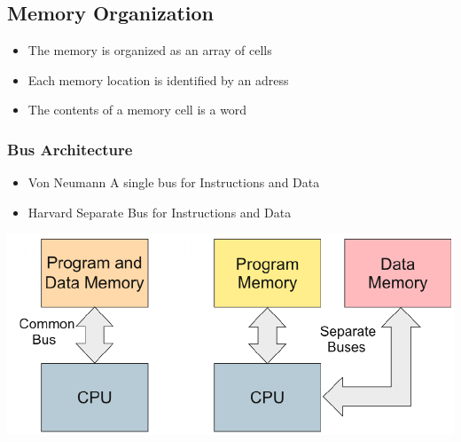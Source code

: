 \clearpage

\subsection{Memory Organization }
\begin{minipage}{9cm}
		\begin{itemize}
			\item The memory is organized as an array of cells
			\item Each memory location is identified by an adress
			\item The contents of a memory cell is a word
		\end{itemize}
    
\subsubsection{Bus Architecture}
    \begin{itemize}
        \item Von Neumann
        \subitem A single bus for Instructions and Data
        \item Harvard
        \subitem Separate Bus for Instructions and Data
    \end{itemize}
\end{minipage}
\begin{minipage}{8cm}
    \includegraphics[width=\linewidth]{images/bus}
\end{minipage}

